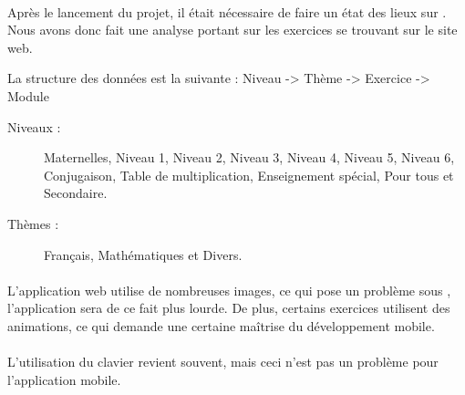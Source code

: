 \paragraph{}Après le lancement du projet, il était nécessaire de faire un état des lieux sur \pepitSite{}. Nous avons donc fait une analyse portant sur les exercices se trouvant sur le site web.

La structure des données est la suivante : Niveau -> Thème -> Exercice -> Module

\begin{description}
\item[Niveaux : ] Maternelles, Niveau 1, Niveau 2, Niveau 3, Niveau 4, Niveau 5, Niveau 6, Conjugaison, Table de multiplication, Enseignement spécial, Pour tous et Secondaire.
\item[Thèmes : ] Français, Mathématiques et Divers.
\end{description}

\paragraph{}L'application web utilise de nombreuses images, ce qui pose un problème sous \android, l'application sera de ce fait plus lourde. De plus, certains exercices utilisent des animations, ce qui demande une certaine ma\^{i}trise du développement mobile.
\paragraph{}L'utilisation du clavier revient souvent, mais ceci n'est pas un problème pour l'application mobile.
